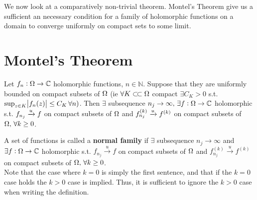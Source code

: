 \begin{center}
\end{center}





We now look at a comparatively non-trivial theorem. Montel's Theorem give us a sufficient an necessary condition for a family of holomorphic functions on a domain to converge uniformly on compact sets to some limit.


\section{Montel's Theorem}

\begin{theorem}\label{thm:montel}
Let $f_n: \Omega \to \mathbb{C}$ holomorphic functions, $n \in \mathbb{N}$. Suppose that they are uniformly bounded on compact subsets of $\Omega$ (ie $\forall K \ssubset \om $ compact $ \exists C_K > 0 $ s.t. $ \sup_{z \in K} \abs{f_n(z)} \leq C_K \, \forall n)$. Then $\exists $ subsequence $n_j \to \infty, \, \exists f:\Omega \rightarrow \mathbb{C}  $ holomorphic s.t. $f_{n_j} \xrightarrow[]{u} f$ on compact subsets  of $\Omega$ and $f_{n_j}^{(k)} \xrightarrow[]{u} f^{(k)}$ on compact subsets of $\Omega , \, \forall k \geq 0$.
\end{theorem}


\begin{definition}
A set of functions is called a \textbf{normal family} if $\exists $ subsequence $n_j \to \infty$ and $ \exists f:\Omega \rightarrow \mathbb{C}  $ holomorphic s.t. $f_{n_j} \xrightarrow[]{u} f$ on compact subsets of $\Omega$ and $f_{n_j}^{(k)} \xrightarrow[]{u} f^{(k)}$ on compact subsets of $\Omega , \, \forall k \geq 0$.\\

Note that the case where $k=0$ is simply the first sentence, and that if the $k=0$ case holds the $k>0$ case is implied. Thus, it is sufficient to ignore the $k>0$ case when writing the definition.
\end{definition}


